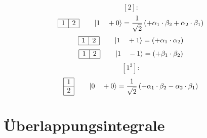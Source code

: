 \documentclass[fleqn]{article}%
\begin{document}
%
\vspace{0.25cm}%
\begin{dmath*}\left[2\right]:\end{dmath*}%
\vspace{0.25cm}%
\begin{dmath*}\begin{array}{|c|c|} \hline 1 & 2\\ \cline{1-2} \end{array} \qquad \ket{ 1 \quad  +0 } = \frac{1}{\sqrt{2}} \left( + \alpha_{1} \cdot \beta_{2}  + \alpha_{2} \cdot \beta_{1}\right) \end{dmath*}%
\vspace{0.25cm}%
\begin{dmath*}\begin{array}{|c|c|} \hline 1 & 2\\ \cline{1-2} \end{array} \qquad \ket{ 1 \quad  +1 } = \left( + \alpha_{1} \cdot \alpha_{2}\right) \end{dmath*}%
\vspace{0.25cm}%
\begin{dmath*}\begin{array}{|c|c|} \hline 1 & 2\\ \cline{1-2} \end{array} \qquad \ket{ 1 \quad  -1 } = \left( + \beta_{1} \cdot \beta_{2}\right) \end{dmath*}%
\vspace{0.25cm}%
\vspace{0.25cm}%
\vspace{0.25cm}%
\begin{dmath*}\left[1^2\right]:\end{dmath*}%
\vspace{0.25cm}%
\begin{dmath*}\begin{array}{|c|} \hline 1\\ \cline{1-1} 2\\ \cline{1-1} \end{array} \qquad \ket{ 0 \quad  +0 } = \frac{1}{\sqrt{2}} \left( + \alpha_{1} \cdot \beta_{2}  - \alpha_{2} \cdot \beta_{1}\right) \end{dmath*}%
\vspace{0.25cm}%
\vspace{0.25cm}%
\newpage%
\section{Überlappungsintegrale}%
\label{sec:berlappungsintegrale}%
\end{document}
